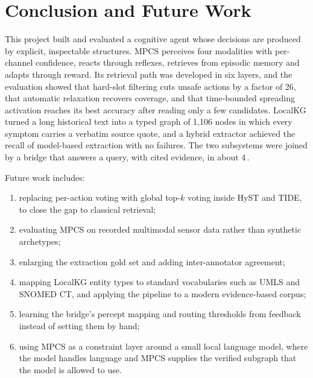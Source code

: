 \documentclass[12pt,a4paper,oneside]{report}
\newcommand{\ms}{\,\text{ms}}
\begin{document}
\chapter{Conclusion and Future Work}\label{ch:conclusion}
This project built and evaluated a cognitive agent whose decisions are produced by explicit, inspectable structures. MPCS perceives four modalities with per-channel confidence, reacts through reflexes, retrieves from episodic memory and adapts through reward. Its retrieval path was developed in six layers, and the evaluation showed that hard-slot filtering cuts unsafe actions by a factor of 26, that automatic relaxation recovers coverage, and that time-bounded spreading activation reaches its best accuracy after reading only a few candidates. LocalKG turned a long historical text into a typed graph of 1,106 nodes in which every symptom carries a verbatim source quote, and a hybrid extractor achieved the recall of model-based extraction with no failures. The two subsystems were joined by a bridge that answers a query, with cited evidence, in about 4\ms{}.

Future work includes:
\begin{enumerate}
  \item replacing per-action voting with global top-$k$ voting inside HyST and TIDE, to close the gap to classical retrieval;
  \item evaluating MPCS on recorded multimodal sensor data rather than synthetic archetypes;
  \item enlarging the extraction gold set and adding inter-annotator agreement;
  \item mapping LocalKG entity types to standard vocabularies such as UMLS and SNOMED CT, and applying the pipeline to a modern evidence-based corpus;
  \item learning the bridge's percept mapping and routing thresholds from feedback instead of setting them by hand;
  \item using MPCS as a constraint layer around a small local language model, where the model handles language and MPCS supplies the verified subgraph that the model is allowed to use.
\end{enumerate}
\end{document}
